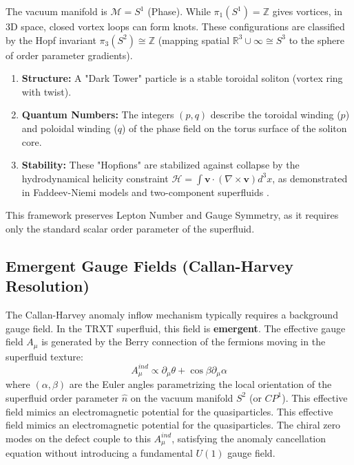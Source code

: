 \documentclass[a4paper,12pt]{article}
\begin{document}
The vacuum manifold is $\mathcal{M} = S^1$ (Phase). While $\pi_1(S^1) = \mathbb{Z}$ gives vortices, in 3D space, closed vortex loops can form knots. These configurations are classified by the Hopf invariant $\pi_3(S^2) \cong \mathbb{Z}$ (mapping spatial $\mathbb{R}^3 \cup \infty \cong S^3$ to the sphere of order parameter gradients).
\begin{enumerate}
    \item \textbf{Structure:} A "Dark Tower" particle is a stable toroidal soliton (vortex ring with twist).
    \item \textbf{Quantum Numbers:} The integers $(p,q)$ describe the toroidal winding ($p$) and poloidal winding ($q$) of the phase field on the torus surface of the soliton core.
    \item \textbf{Stability:} These "Hopfions" are stabilized against collapse by the hydrodynamical helicity constraint $\mathcal{H} = \int \mathbf{v} \cdot (\nabla \times \mathbf{v}) d^3x$, as demonstrated in Faddeev-Niemi models and two-component superfluids \cite{faddeev, babaev}.
\end{enumerate}
This framework preserves Lepton Number and Gauge Symmetry, as it requires only the standard scalar order parameter of the superfluid.

\subsection{Emergent Gauge Fields (Callan-Harvey Resolution)}
The Callan-Harvey anomaly inflow mechanism typically requires a background gauge field. In the TRXT superfluid, this field is \textbf{emergent}.
The effective gauge field $A_\mu$ is generated by the Berry connection of the fermions moving in the superfluid texture:
\begin{equation}
    A_\mu^{ind} \propto \partial_\mu \theta + \cos \beta \partial_\mu \alpha
\end{equation}
where $(\alpha, \beta)$ are the Euler angles parametrizing the local orientation of the superfluid order parameter $\hat{n}$ on the vacuum manifold $S^2$ (or $CP^1$). This effective field mimics an electromagnetic potential for the quasiparticles.
This effective field mimics an electromagnetic potential for the quasiparticles. The chiral zero modes on the defect couple to this $A_\mu^{ind}$, satisfying the anomaly cancellation equation without introducing a fundamental $U(1)$ gauge field.

\newpage
\end{document}
